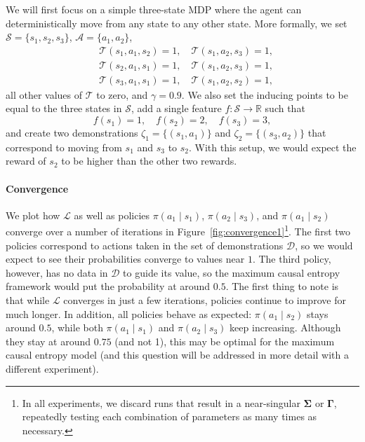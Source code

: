 \documentclass{mpaper}
\newcommand{\pione}{\pi(a_1 \mid s_1)}
\newcommand{\pitwo}{\pi(a_1 \mid s_2)}
\newcommand{\pithree}{\pi(a_2 \mid s_3)}
\begin{document}
We will first focus on a simple three-state MDP where the agent can
deterministically move from any state to any other state. More formally, we set
$\mathcal{S} = \{s_1, s_2, s_3 \}$, $\mathcal{A} = \{ a_1, a_2 \}$,
\begin{align*}
  &\mathcal{T}(s_1, a_1, s_2) = 1, \quad \mathcal{T}(s_1, a_2, s_3) = 1, \\
  &\mathcal{T}(s_2, a_1, s_1) = 1, \quad \mathcal{T}(s_1, a_2, s_3) = 1, \\
  &\mathcal{T}(s_3, a_1, s_1) = 1, \quad \mathcal{T}(s_1, a_2, s_2) = 1,
\end{align*}
all other values of $\mathcal{T}$ to zero, and $\gamma = 0.9$. We
also set the inducing points to be equal to the three states in $\mathcal{S}$,
add a single feature $f : \mathcal{S} \to \mathbb{R}$ such that
\[
  f(s_1) = 1, \quad f(s_2) = 2, \quad f(s_3) = 3,
\]
and create two demonstrations $\zeta_1 = \{ (s_1, a_1) \}$ and $\zeta_2 = \{
(s_3, a_2) \}$ that correspond to moving from $s_1$ and $s_3$ to $s_2$. With
this setup, we would expect the reward of $s_2$ to be higher than the other two
rewards.

\paragraph{Convergence}

We plot how $\mathcal{L}$ as well as policies $\pi(a_1 \mid s_1)$, $\pi(a_2 \mid
s_3)$, and $\pi(a_1 \mid s_2)$ converge over a number of iterations in
Figure~\ref{fig:convergence1}\footnote{In all experiments, we discard runs that
  result in a near-singular $\bm\Sigma$ or $\bm\Gamma$, repeatedly testing each
  combination of parameters as many times as necessary.}. The first two policies
correspond to actions taken in the set of demonstrations $\mathcal{D}$, so we
would expect to see their probabilities converge to values near $1$. The third
policy, however, has no data in $\mathcal{D}$ to guide its value, so the maximum
causal entropy framework would put the probability at around $0.5$. The first
thing to note is that while $\mathcal{L}$ converges in just a few iterations,
policies continue to improve for much longer. In addition, all policies behave
as expected: $\pitwo$ stays around $0.5$, while both $\pione$ and $\pithree$
keep increasing. Although they stay at around $0.75$ (and not 1), this may be
optimal for the maximum causal entropy model (and this question will be
addressed in more detail with a different experiment).
\end{document}

